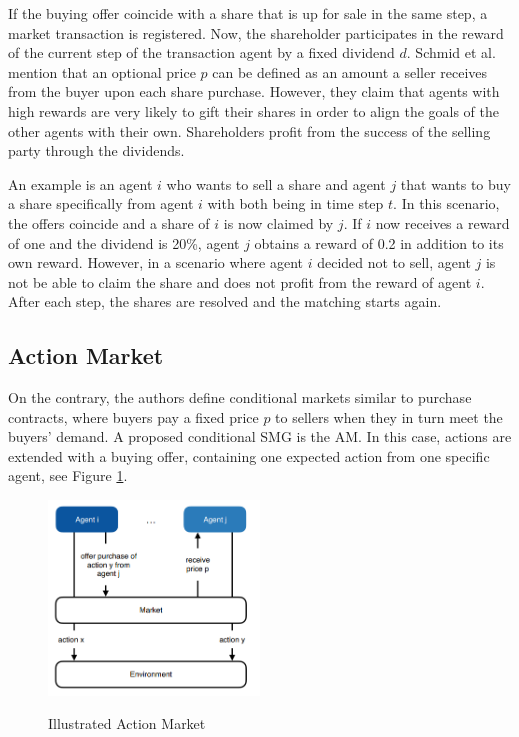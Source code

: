 If the buying offer coincide with a share that is up for sale in the same step, a market transaction is registered. Now, the shareholder participates in the reward of the current step of the transaction agent by a fixed dividend $d$. Schmid et al. mention that an optional price $p$ can be defined as an amount a seller receives from the buyer upon each share purchase. However, they claim that agents with high rewards are very likely to gift their shares in order to align the goals of the other agents with their own. Shareholders profit from the success of the selling party through the dividends.

An example is an agent $i$ who wants to sell a share and agent $j$ that wants to buy a share specifically from agent $i$ with both being in time step $t$. In this scenario, the offers coincide and a share of $i$ is now claimed by $j$. If $i$ now receives a reward of one and the dividend is 20\%, agent $j$ obtains a reward of 0.2 in addition to its own reward. However, in a scenario where agent $i$ decided not to sell, agent $j$ is not be able to claim the share and does not profit from the reward of agent $i$. After each step, the shares are resolved and the matching starts again.

\subsection{Action Market}
On the contrary, the authors define conditional markets similar to purchase contracts, where buyers pay a fixed price $p$ to sellers when they in turn meet the buyers' demand. A proposed conditional SMG is the AM. In this case, actions are extended with a buying offer, containing one expected action from one specific agent, see Figure \ref{fig:am}.

\begin{figure}[hpbt]
    \centering
    \includegraphics[width=0.5\textwidth]{pictures/SMG_am}\\
    \caption[Action Market]{Illustrated Action Market}\label{fig:am}
\end{figure}

